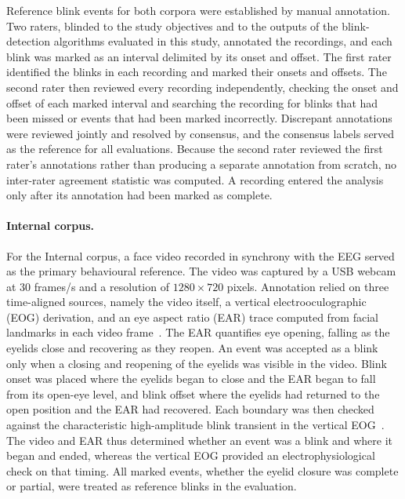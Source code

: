 

Reference blink events for both corpora were established by manual annotation. Two raters, blinded to the study objectives and to the outputs of the blink-detection algorithms evaluated in this study, annotated the recordings, and each blink was marked as an interval delimited by its onset and offset. The first rater identified the blinks in each recording and marked their onsets and offsets. The second rater then reviewed every recording independently, checking the onset and offset of each marked interval and searching the recording for blinks that had been missed or events that had been marked incorrectly. Discrepant annotations were reviewed jointly and resolved by consensus, and the consensus labels served as the reference for all evaluations. Because the second rater reviewed the first rater's annotations rather than producing a separate annotation from scratch, no inter-rater agreement statistic was computed. A recording entered the analysis only after its annotation had been marked as complete.

\paragraph{Internal corpus.}
For the Internal corpus, a face video recorded in synchrony with the EEG served as the primary behavioural reference. The video was captured by a USB webcam at 30 frames/s and a resolution of $1280\times720$ pixels.
Annotation relied on three time-aligned sources, namely the video itself, a vertical electrooculographic (EOG) derivation, and an eye aspect ratio (EAR) trace computed from facial landmarks in each video frame~\citep{dewi2022adjusting}. The EAR quantifies eye opening, falling as the eyelids close and recovering as they reopen. An event was accepted as a blink only when a closing and reopening of the eyelids was visible in the video. Blink onset was placed where the eyelids began to close and the EAR began to fall from its open-eye level, and blink offset where the eyelids had returned to the open position and the EAR had recovered. Each boundary was then checked against the characteristic high-amplitude blink transient in the vertical EOG~\citep{croft2000removal}. The video and EAR thus determined whether an event was a blink and where it began and ended, whereas the vertical EOG provided an electrophysiological check on that timing. All marked events, whether the eyelid closure was complete or partial, were treated as reference blinks in the evaluation.


